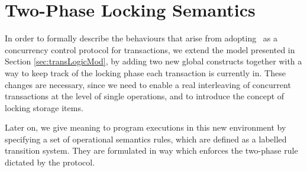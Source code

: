 \chapter{Two-Phase Locking Semantics}

In order to formally describe the behaviours that arise from adopting \tpl\ as a concurrency control protocol for transactions, we extend the model presented in Section \ref{sec:transLogicMod}, by adding two new global constructs together with a way to keep track of the locking phase each transaction is currently in. These changes are necessary, since we need to enable a real interleaving of concurrent transactions at the level of single operations, and to introduce the concept of locking storage items.

Later on, we give meaning to program executions in this new environment by specifying a set of operational semantics rules, which are defined as a labelled transition system. They are formulated in way which enforces the two-phase rule dictated by the protocol.



